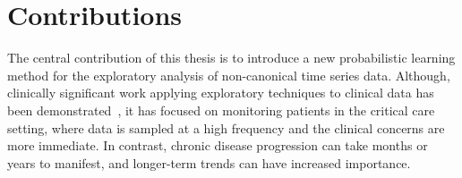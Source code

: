 \section{Contributions}

The central contribution of this thesis is to introduce a new probabilistic learning method for the exploratory analysis of non-canonical time series data.  Although, clinically significant work applying exploratory techniques to clinical data has been demonstrated~\cite{Marlin12,Saria09}, it has focused on monitoring patients in the critical care setting, where data is sampled at a high frequency and the clinical concerns are more immediate.  In contrast, chronic disease progression can take months or years to manifest, and longer-term trends can have increased importance.






